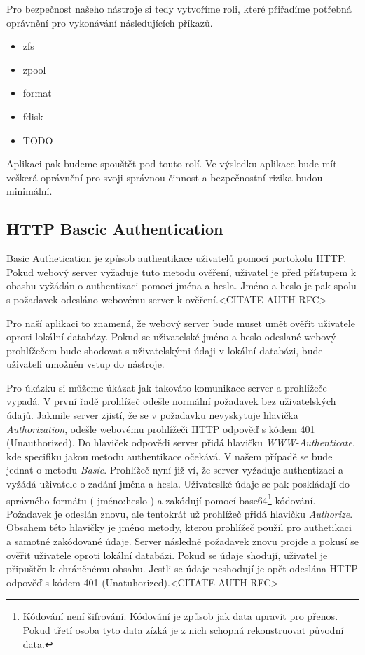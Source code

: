     Pro bezpečnost našeho nástroje si tedy vytvoříme roli, které přiřadíme potřebná oprávnění pro vykonávání následujících příkazů.
    \begin{itemize}
      \item zfs
      \item zpool
      \item format
      \item fdisk
      \item TODO
    \end{itemize}

    Aplikaci pak budeme spouštět pod touto rolí. Ve výsledku aplikace bude mít veškerá oprávnění pro svoji správnou činnost a bezpečnostní rizika budou minimální.
    \subsection{HTTP Bascic Authentication}
    \label{httpauth}
    Basic Authetication je způsob authentikace uživatelů pomocí portokolu HTTP. Pokud webový server vyžaduje tuto metodu ověření, uživatel je před přístupem k obashu vyžádán o authentizaci pomocí jména a hesla. Jméno a heslo je pak spolu s požadavek odesláno webovému server k ověření.<CITATE AUTH RFC>

    Pro naší aplikaci to znamená, že webový server bude muset umět ověřit uživatele oproti lokální databázy. Pokud se uživatelské jméno a heslo odeslané webový prohlížečem bude shodovat s uživatelskými údaji v lokální databázi, bude uživateli umožněn vstup do nástroje.

    Pro úkázku si můžeme úkázat jak takováto komunikace server a prohlížeče vypadá. V první řadě prohlížeč odešle normální požadavek bez uživatelských údajů. Jakmile server zjistí, že se v požadavku nevyskytuje hlavička \emph{Authorization}, odešle webovému prohlížeči HTTP odpověď s kódem 401 (Unauthorized). Do hlaviček odpovědi server přidá hlavičku \emph{WWW-Authenticate}, kde specifiku jakou metodu authentikace očekává. V našem případě se bude jednat o metodu \emph{Basic}. Prohlížeč nyní již ví, že server vyžaduje authentizaci a vyžádá uživatele o zadání jména a hesla. Uživateslké údaje se pak poskládají do správného formátu ( jméno:heslo ) a zakódují pomocí base64\footnote{Kódování není šifrování. Kódování je způsob jak data upravit pro přenos. Pokud třetí osoba tyto data zízká je z nich schopná rekonstruovat původní data.} kódování. Požadavek je odeslán znovu, ale tentokrát už prohlížeč přidá hlavičku \emph{Authorize}. Obsahem této hlavičky je jméno metody, kterou prohlížeč použil pro authetikaci a samotné zakódované údaje. Server následně požadavek znovu projde a pokusí se ověřit uživatele oproti lokální databázi. Pokud se údaje shodují, uživatel je připuštěn k chráněnému obsahu. Jestli se údaje neshodují je opět odeslána HTTP odpověď s kódem 401 (Unatuhorized).<CITATE AUTH RFC>

